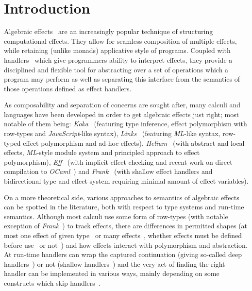 \documentclass[inz, english, longabstract]{iithesis}
\author         {Maciej Buszka}
\begin{document}
%
\chapter{Introduction}
% 
%
%
%
Algebraic effects~\cite{Plotkin2003} are an increasingly popular technique of structuring computational effects.
They allow for seamless composition of multiple effects, while retaining (unlike monads) applicative style of programs.
Coupled with handlers~\cite{Plotkin2013} which give programmers ability to interpret effects, they provide a disciplined and flexible tool for abstracting over a set of operations which a program may perform as well as separating this interface from the semantics of those operations defined as effect handlers.

As composability and separation of concerns are sought after, many calculi and languages have been developed in order to get algebraic effects just right; most notable of them being: \emph{Koka}~\cite{Leijen2014} (featuring type inference, effect polymorphism with row-types and \emph{JavaScript}-like syntax), \emph{Links}~\cite{Hillerstrom2016} (featuring \emph{ML}-like syntax, row-typed effect polymorphism and ad-hoc effects), \emph{Helium}~\cite{Biernacki2019} (with abstract and local effects, \emph{ML}-style module system and principled approach to effect polymorphism), \emph{Eff}~\cite{Bauer2012} (with implicit effect checking and recent work on direct compilation to \emph{OCaml}~\cite{Kiselyov2018}) and \emph{Frank}~\cite{Lindley2017} (with shallow effect handlers and bidirectional type and effect system requiring minimal amount of effect variables). 

On a more theoretical side, various approaches to semantics of algebraic effects can be spotted in the literature, both with respect to type systems and run-time semantics.
Although most calculi use some form of row-types (with notable exception of \emph{Frank}~\cite{Lindley2017}) to track effects, there are differences in permitted shapes (at most one effect of given type~\cite{Hillerstrom2016} or many effects~\cite{Biernacki2017,Leijen2014}, whether effects must be defined before use~\cite{Biernacki2017,Lindley2017,Leijen2014,Bauer2012} or not~\cite{Hillerstrom2016}) and how effects interact with polymorphism and abstraction.
At run-time handlers can wrap the captured continuation (giving so-called deep handlers~\cite{Biernacki2017,Hillerstrom2016,Leijen2014,Bauer2012}) or not (shallow handlers~\cite{Lindley2017}) and the very act of finding the right handler can be implemented in various ways, mainly depending on some constructs which skip handlers~\cite{Biernacki2017}. 
\end{document}
